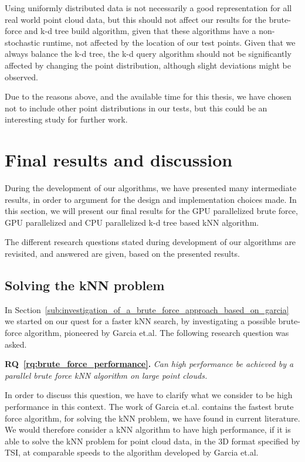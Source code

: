 Using uniformly distributed data is not necessarily a good representation for all real world point cloud data, but this should not affect our results for the brute-force and k-d tree build algorithm, given that these algorithms have a non-stochastic runtime, not affected by the location of our test points. Given that we always balance the k-d tree, the k-d query algorithm should not be significantly affected by changing the point distribution, although slight deviations might be observed.

Due to the reasons above, and the available time for this thesis, we have chosen not to include other point distributions in our tests, but this could be an interesting study for further work.

\section{Final results and discussion} %
\label{sec:final_results_and_discusstion}

During the development of our algorithms, we have presented many intermediate results, in order to argument for the design and implementation choices made. In this section, we will present our final results for the GPU parallelized brute force, GPU parallelized and CPU parallelized k-d tree based kNN algorithm.

The different research questions stated during development of our algorithms are revisited, and answered are given, based on the presented results.

\subsection{Solving the kNN problem} %
\label{sub:solving_the_knn_problem}

In Section~\ref{sub:investigation_of_a_brute_force_approach_based_on_garcia} we started on our quest for a faster kNN search, by investigating a possible brute-force algorithm, pioneered by Garcia et.al. The following research question was asked. 

\textbf{RQ~\ref{rq:brute_force_performance}.} \emph{Can high performance be achieved by a parallel brute force kNN algorithm on large point clouds.}

In order to discuss this question, we have to clarify what we consider to be high performance in this context. The work of Garcia et.al. contains the fastest brute force algorithm, for solving the kNN problem, we have found in current literature. We would therefore consider a kNN algorithm to have high performance, if it is able to solve the kNN problem for point cloud data, in the 3D format specified by TSI, at comparable speeds to the algorithm developed by Garcia et.al. 

